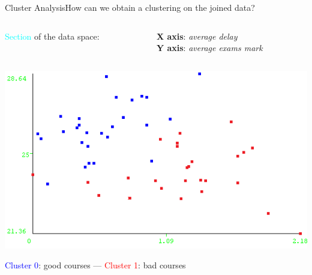 \begin{frame}{Cluster Analysis}{How can we obtain a clustering on the joined data?}

\vspace{0.2cm}
\begin{columns}
\begin{column}{0.5\textwidth}
   \textcolor{cyan}{Section} of the data space:
\end{column}
\begin{column}{0.5\textwidth}
     \textbf{X axis}: \emph{average delay} \\ \textbf{Y axis}: \emph{average exams mark}
\end{column}
\end{columns}

    \vspace{0.1cm}
    \begin{centering}
        \hspace{0.5cm}\includegraphics[scale=0.65]{cluster1.png}
    \end{centering}

    \textcolor{blue}{Cluster 0}: good courses --- \textcolor{red}{Cluster 1}: bad courses

\end{frame}

